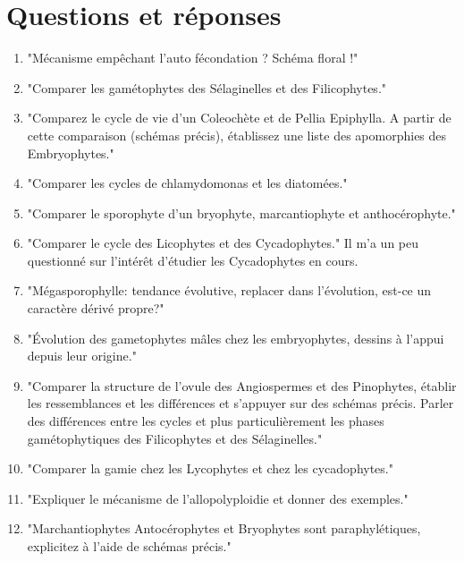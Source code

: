 \section{Questions et réponses}



\begin{enumerate}
	\item "Mécanisme empêchant l'auto fécondation ? Schéma floral !"

	\item "Comparer les gamétophytes des Sélaginelles et des Filicophytes."

	\item "Comparez le cycle de vie d'un Coleochète et de Pellia Epiphylla. A partir de cette comparaison (schémas précis), établissez une liste des apomorphies des Embryophytes."

	\item "Comparer les cycles de chlamydomonas et les diatomées."

	\item "Comparer le sporophyte d'un bryophyte, marcantiophyte et anthocérophyte."

	\item "Comparer le cycle des Licophytes et des Cycadophytes." Il m'a un peu questionné sur l'intérêt d'étudier les Cycadophytes en cours.

	\item "Mégasporophylle: tendance évolutive, replacer dans l'évolution, est-ce un caractère dérivé propre?"

	\item "Évolution des gametophytes mâles chez les embryophytes, dessins à l'appui depuis leur origine."

	\item "Comparer la structure de l'ovule des Angiospermes et des Pinophytes, établir les ressemblances et les différences et s'appuyer sur des schémas précis. Parler des différences entre les cycles et plus particulièrement les phases gamétophytiques des Filicophytes et des Sélaginelles."

	\item "Comparer la gamie chez les Lycophytes et chez les cycadophytes."

	\item "Expliquer le mécanisme de l'allopolyploidie et donner des exemples."

	\item "Marchantiophytes Antocérophytes et Bryophytes sont paraphylétiques, explicitez à l'aide de schémas précis."


\end{enumerate}
